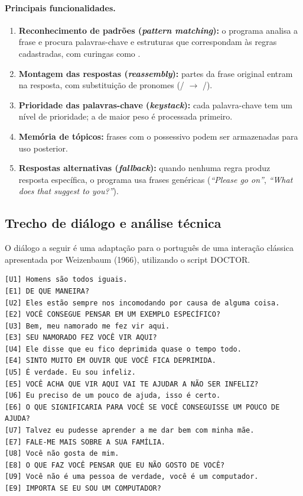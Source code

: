 \documentclass[12pt, a4paper]{article}
\DeclareRobustCommand{\texttt}[1]{\breakabletexttt{#1}}
\begin{document}
\paragraph{Principais funcionalidades.}
\begin{enumerate}[leftmargin=*]
  \item \textbf{Reconhecimento de padrões (\textit{pattern matching}):} o programa analisa a frase e procura palavras-chave e estruturas que correspondam às regras cadastradas, com curingas como \texttt{*}.
  \item \textbf{Montagem das respostas (\textit{reassembly}):} partes da frase original entram na resposta, com substituição de pronomes (\texttt{I}/\texttt{my} $\rightarrow$ \texttt{you}/\texttt{your}).
  \item \textbf{Prioridade das palavras-chave (\textit{keystack}):} cada palavra-chave tem um nível de prioridade; a de maior peso é processada primeiro.
  \item \textbf{Memória de tópicos:} frases com o possessivo \texttt{my} podem ser armazenadas para uso posterior.
  \item \textbf{Respostas alternativas (\textit{fallback}):} quando nenhuma regra produz resposta específica, o programa usa frases genéricas (\emph{``Please go on''}, \emph{``What does that suggest to you?''}).
\end{enumerate}

\subsection{Trecho de diálogo e análise técnica}

O diálogo a seguir é uma adaptação para o português de uma interação clássica apresentada por Weizenbaum (1966), utilizando o script DOCTOR.

{\footnotesize
\begin{verbatim}
[U1] Homens são todos iguais.
[E1] DE QUE MANEIRA?
[U2] Eles estão sempre nos incomodando por causa de alguma coisa.
[E2] VOCÊ CONSEGUE PENSAR EM UM EXEMPLO ESPECÍFICO?
[U3] Bem, meu namorado me fez vir aqui.
[E3] SEU NAMORADO FEZ VOCÊ VIR AQUI?
[U4] Ele disse que eu fico deprimida quase o tempo todo.
[E4] SINTO MUITO EM OUVIR QUE VOCÊ FICA DEPRIMIDA.
[U5] É verdade. Eu sou infeliz.
[E5] VOCÊ ACHA QUE VIR AQUI VAI TE AJUDAR A NÃO SER INFELIZ?
[U6] Eu preciso de um pouco de ajuda, isso é certo.
[E6] O QUE SIGNIFICARIA PARA VOCÊ SE VOCÊ CONSEGUISSE UM POUCO DE AJUDA?
[U7] Talvez eu pudesse aprender a me dar bem com minha mãe.
[E7] FALE-ME MAIS SOBRE A SUA FAMÍLIA.
[U8] Você não gosta de mim.
[E8] O QUE FAZ VOCÊ PENSAR QUE EU NÃO GOSTO DE VOCÊ?
[U9] Você não é uma pessoa de verdade, você é um computador.
[E9] IMPORTA SE EU SOU UM COMPUTADOR?
\end{verbatim}
}
\end{document}
